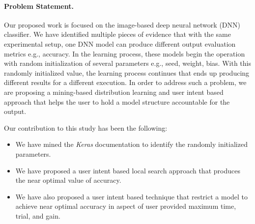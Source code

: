 \paragraph{Problem Statement. }Our proposed work is focused on the image-based deep neural network (DNN) classifier. We have identified multiple pieces of evidence that with the same experimental setup, one DNN model can produce different output evaluation metrics e.g., accuracy. In the learning process, these models begin the operation with random initialization of several parameters e.g., seed, weight, bias. With this randomly initialized value, the learning process continues that ends up producing different results for a different execution. In order to address such a problem, we are proposing a mining-based distribution learning and 
user intent based approach that helps the user to hold a model structure accountable for the output.


Our contribution to this study has been the following:
\begin{itemize}
	\item We have mined the \emph{Keras} documentation to identify the randomly initialized parameters.
	\item We have proposed a user intent based local search approach that produces the near optimal value of accuracy.
	\item We have also proposed a user intent based technique that restrict a model to achieve near optimal accuracy in aspect of user provided maximum time, trial, and gain.
\end{itemize}
